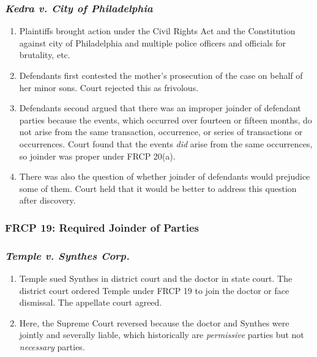 \subsubsection{\emph{Kedra v. City of Philadelphia}}

\begin{enumerate}
    \item Plaintiffs brought action under the Civil Rights Act and the 
    Constitution against city of Philadelphia and multiple police officers and 
    officials for brutality, etc.
    \item Defendants first contested the mother's prosecution of the case on 
    behalf of her minor sons. Court rejected this as frivolous.
    \item Defendants second argued that there was an improper joinder of 
    defendant parties because the events, which occurred over fourteen or 
    fifteen months, do not arise from the same transaction, occurrence, or 
    series of transactions or occurrences. Court found that the events 
    \emph{did} arise from the same occurrences, so joinder was proper under 
    FRCP 20(a).
    \item There was also the question of whether joinder of defendants would 
    prejudice some of them. Court held that it would be better to address this 
    question after discovery.
\end{enumerate}

\subsubsection{FRCP 19: Required Joinder of Parties}


\subsubsection{\emph{Temple v. Synthes Corp.}}

\begin{enumerate}
    \item Temple sued Synthes in district court and the doctor in state court. 
    The district court ordered Temple under FRCP 19 to join the doctor or face 
    dismissal. The appellate court agreed.
    \item Here, the Supreme Court reversed because the doctor and Synthes were 
    jointly and severally liable, which historically are \emph{permissive} 
    parties but not \emph{necessary} parties.
\end{enumerate}

